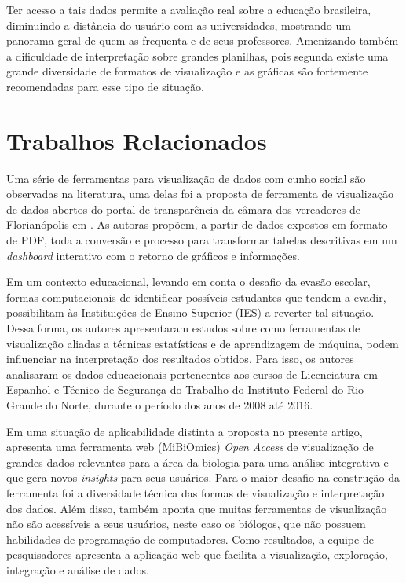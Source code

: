 \documentclass[12pt]{article}
\begin{document}
Ter acesso a tais dados permite a avaliação real sobre a educação brasileira, diminuindo a distância do usuário com as universidades, mostrando um panorama geral de quem as frequenta e de seus professores. Amenizando também a dificuldade de interpretação sobre grandes planilhas, pois segunda \cite{macedo:2020} existe uma grande diversidade de formatos de visualização e as gráficas são fortemente recomendadas para esse tipo de situação.

\section{Trabalhos Relacionados}\label{trabalhosRelacionados}
Uma série de ferramentas para visualização de dados com cunho social são observadas na literatura, uma delas foi a proposta de ferramenta de visualização de dados abertos do portal de transparência da câmara dos vereadores de Florianópolis em \cite{santos:21}. As autoras propõem, a partir de dados expostos em formato de PDF, toda a conversão e processo para transformar tabelas descritivas em um \textit{dashboard} interativo com o retorno de gráficos e informações.

Em um contexto educacional, levando em conta o desafio da evasão escolar, formas computacionais de identificar possíveis estudantes que tendem a evadir, possibilitam às Instituições de Ensino Superior (IES) a reverter tal situação. Dessa forma, os autores \cite{barros:2017} apresentaram estudos sobre como ferramentas de visualização aliadas a técnicas estatísticas e de aprendizagem de máquina, podem influenciar na interpretação dos resultados obtidos. Para isso, os autores analisaram os dados educacionais pertencentes aos cursos de Licenciatura em Espanhol e Técnico de Segurança do Trabalho do Instituto Federal do Rio Grande do Norte, durante o período dos anos de 2008 até 2016.

Em uma situação de aplicabilidade distinta a proposta no presente artigo, \cite{zoppi:2021} apresenta uma ferramenta web (MiBiOmics) \textit{Open Access} de visualização de grandes dados relevantes para a área da biologia para uma análise integrativa e que gera novos \textit{insights} para seus usuários. Para \cite{zoppi:2021} o maior desafio na construção da ferramenta foi a diversidade técnica das formas de visualização e interpretação dos dados. Além disso, também aponta que muitas ferramentas de visualização não são acessíveis a seus usuários, neste caso os biólogos, que não possuem habilidades de programação de computadores. Como resultados, a equipe de pesquisadores apresenta a aplicação web que facilita a visualização, exploração, integração e análise de dados. 
\end{document}

